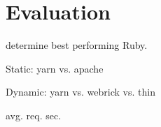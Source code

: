 \section{Evaluation}

determine best performing Ruby.

Static: yarn vs. apache

Dynamic: yarn vs. webrick vs. thin

avg. req. sec.
